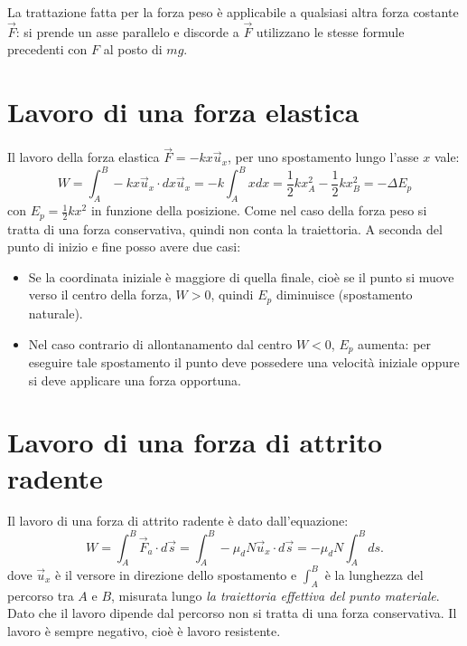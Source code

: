 \documentclass[class=book, crop=false, oneside, 12pt]{standalone}
\begin{document}
La trattazione fatta per la forza peso è applicabile a qualsiasi altra forza costante \(\overrightarrow{F}\): si prende un asse parallelo e discorde a \(\overrightarrow{F}\) utilizzano le stesse formule precedenti con \(F\) al posto di \(mg\).

\section{Lavoro di una forza elastica}

Il lavoro della forza elastica \(\overrightarrow{F} =-k x \overrightarrow{u}_x\), per uno spostamento lungo l'asse \(x\) vale:
\begin{equation}
    W = \int_A^B -k x\overrightarrow{u}_x \cdot dx \overrightarrow{u}_x = -k \int_A^B x dx = \frac{1}{2} k x^2_A - \frac{1}{2} k x^2_B = - \Delta E_p
\end{equation}
con \(E_p = \frac{1}{2} k x^2\) in funzione della posizione.\newline
Come nel caso della forza peso si tratta di una forza conservativa, quindi non conta la traiettoria.
A seconda del punto di inizio e fine posso avere due casi:
\begin{itemize}
    \item Se la coordinata iniziale è maggiore di quella finale, cioè se il punto si muove verso il centro della forza, \(W>0\), quindi \(E_p\) diminuisce (spostamento naturale).
    \item Nel caso contrario di allontanamento dal centro \(W < 0\), \(E_p\) aumenta: per eseguire tale spostamento il punto deve possedere una velocità iniziale oppure si deve applicare una forza opportuna.
\end{itemize}

\section{Lavoro di una forza di attrito radente}

Il lavoro di una forza di attrito radente è dato dall'equazione:
\begin{equation}
    W = \int_A^B \overrightarrow{F}_a \cdot d \overrightarrow{s} = \int_A^B -\mu_d N \overrightarrow{u}_x \cdot d \overrightarrow{s} = - \mu_d N \int_A^B ds .
\end{equation}
dove \(\overrightarrow{u}_x\) è il versore in direzione dello spostamento e \(\int_A^B\) è la lunghezza del percorso tra \(A\) e \(B\), misurata lungo \emph{la traiettoria effettiva del punto materiale}.\newline
Dato che il lavoro dipende dal percorso non si tratta di una forza conservativa.\newline
Il lavoro è sempre negativo, cioè è lavoro resistente.
\end{document}
